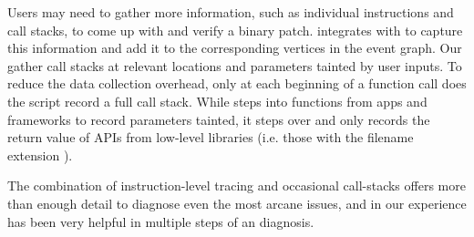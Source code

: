 Users may need to gather more information, such as individual instructions and
call stacks, to come up with and verify a binary patch. \xxx integrates with
 to capture this information and add it to the corresponding
vertices in the event graph. Our  gather call stacks at
relevant locations and parameters tainted by user inputs. To reduce the data
collection overhead, only at each beginning of a function call does the script
record a full call stack. While  steps into functions from apps and
frameworks to record parameters tainted, it steps over and only records the
return value of APIs from low-level libraries (i.e. those with the filename
extension ).

The combination of instruction-level tracing and occasional call-stacks offers
more than enough detail to diagnose even the most arcane issues, and in our
experience has been very helpful in multiple steps of an \xxx diagnosis.
